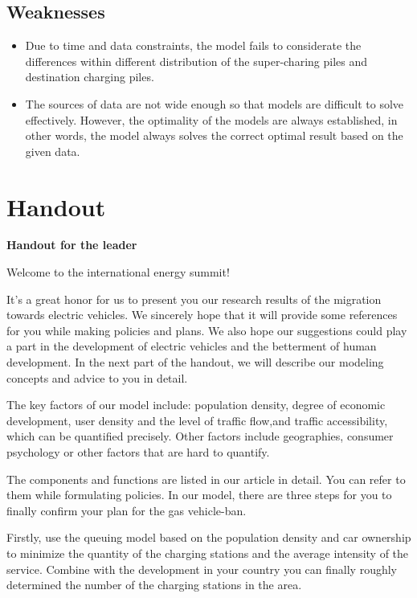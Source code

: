 \documentclass[12pt]{article}  %
\begin{document}
\subsection{Weaknesses}
\begin{itemize}
	\item Due to time and data constraints, the model fails to considerate the differences within different distribution of the super-charing piles and destination charging piles.
	\item The sources of data are not wide enough so that models are difficult to solve effectively. However, the optimality of the models are always established, in other words, the model always solves the correct optimal result based on the given data. 
\end{itemize}


\clearpage
\section{Handout}
\begin{center}
	\textbf{Handout for the leader}
\end{center}

Welcome to the international energy summit!

It’s a great honor for us to present you our research results of the migration towards electric vehicles. We sincerely hope that it will provide some references for you while making policies and plans. We also hope our suggestions could play a part in the development of electric vehicles and the betterment of human development. In the next part of the handout, we will describe our modeling concepts and advice to you in detail.

The key factors of our model include: population density, degree of economic development, user density and the level of traffic flow,and traffic accessibility, which can be quantified precisely. Other factors include geographies, consumer psychology or other factors that are hard to quantify.

The components and functions are listed in our article in detail. You can refer to them while formulating policies. In our model, there are three steps for you to finally confirm your plan for the gas vehicle-ban.

Firstly, use the queuing model based on the population density and car ownership to minimize the quantity of the charging stations and the average intensity of the service. Combine with the development in your country you can finally roughly determined the number of the charging stations in the area.
\end{document}
